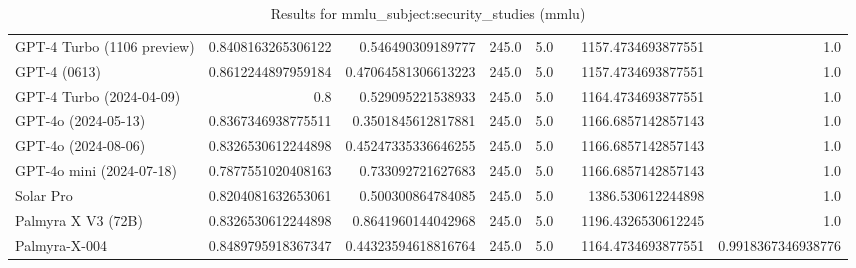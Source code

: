 \begin{table}[htp]
{\begin{tabular}{lrrrrrrr}
GPT-4 Turbo (1106 preview) & 0.8408163265306122 & 0.546490309189777 & 245.0 & 5.0 &  & 1157.4734693877551 & 1.0 \\
GPT-4 (0613) & 0.8612244897959184 & 0.47064581306613223 & 245.0 & 5.0 &  & 1157.4734693877551 & 1.0 \\
GPT-4 Turbo (2024-04-09) & 0.8 & 0.529095221538933 & 245.0 & 5.0 &  & 1164.4734693877551 & 1.0 \\
GPT-4o (2024-05-13) & 0.8367346938775511 & 0.3501845612817881 & 245.0 & 5.0 &  & 1166.6857142857143 & 1.0 \\
GPT-4o (2024-08-06) & 0.8326530612244898 & 0.45247335336646255 & 245.0 & 5.0 &  & 1166.6857142857143 & 1.0 \\
GPT-4o mini (2024-07-18) & 0.7877551020408163 & 0.733092721627683 & 245.0 & 5.0 &  & 1166.6857142857143 & 1.0 \\
Solar Pro & 0.8204081632653061 & 0.500300864784085 & 245.0 & 5.0 &  & 1386.530612244898 & 1.0 \\
Palmyra X V3 (72B) & 0.8326530612244898 & 0.8641960144042968 & 245.0 & 5.0 &  & 1196.4326530612245 & 1.0 \\
Palmyra-X-004 & 0.8489795918367347 & 0.44323594618816764 & 245.0 & 5.0 &  & 1164.4734693877551 & 0.9918367346938776 \\
\bottomrule
\end{tabular}}
\caption{Results for mmlu_subject:security_studies (mmlu)}
\label{fig:mmlu_subject:security_studies (mmlu)}
\end{table}